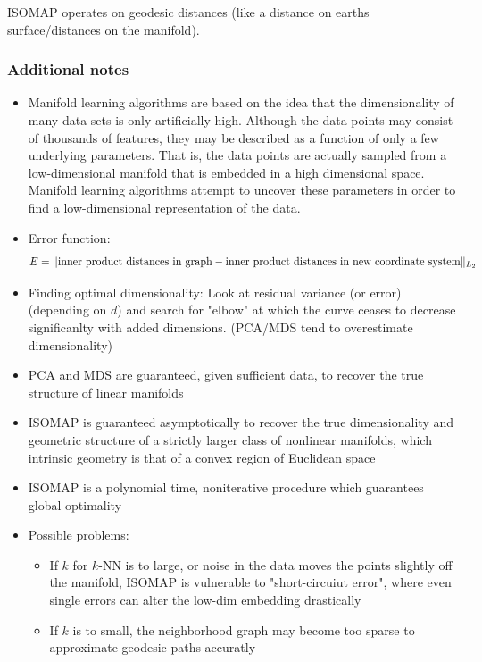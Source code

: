 \documentclass{scrartcl}
\DeclarePairedDelimiter\norm{\lVert}{\rVert}%
\begin{document}
ISOMAP operates on geodesic distances (like a distance on earths surface/distances on the manifold).

\subsubsection{Additional notes}
\begin{itemize}
    \item
        Manifold learning algorithms are based on the idea that the dimensionality of many data sets is only artificially high. Although the data points may consist of thousands of features, they may be described as a function of only a few underlying parameters. That is, the data points are actually sampled from a low-dimensional manifold that is embedded in a high dimensional space. Manifold learning algorithms attempt to uncover these parameters in order to find a low-dimensional representation of the data.
    \item
        Error function: \[E = \norm{\text{inner product distances in graph} - \text{inner product distances in new coordinate system}}_{L_2}\]
    \item
        Finding optimal dimensionality: Look at residual variance (or error) (depending on \(d\)) and search for "elbow" at which the curve ceases to decrease significanlty with added dimensions. (PCA/MDS tend to overestimate dimensionality)
    \item
        PCA and MDS are guaranteed, given sufficient data, to recover the true structure of linear manifolds
    \item
        ISOMAP is guaranteed asymptotically to recover the true dimensionality and geometric structure of a strictly larger class of nonlinear manifolds, which intrinsic geometry is that of a convex region of Euclidean space
    \item
        ISOMAP is a polynomial time, noniterative procedure which guarantees global optimality
    \item
        Possible problems:
        \begin{itemize}
            \item
                If \(k\) for \(k\)-NN is to large, or noise in the data moves the points slightly off the manifold, ISOMAP is vulnerable to "short-circuiut error", where even single errors can alter the low-dim embedding drastically
            \item
                If \(k\) is to small, the neighborhood graph may become too sparse to approximate geodesic paths accuratly
                
        \end{itemize}
\end{itemize}
\end{document}
